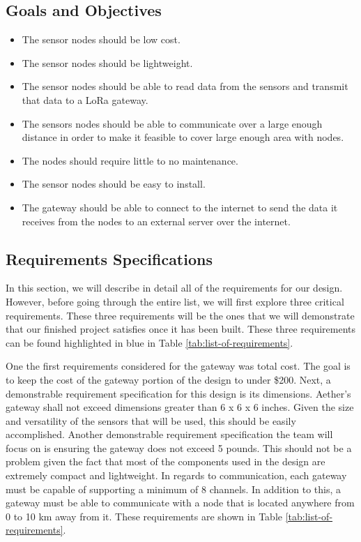 \subsection{Goals and Objectives}
\begin{itemize}
    \item The sensor nodes should be low cost.
    \item The sensor nodes should be lightweight.
    \item The sensor nodes should be able to read data from the sensors and transmit that data to a LoRa gateway.
    \item The sensors nodes should be able to communicate over a large enough distance in order to make it feasible to cover large enough area with nodes.
    \item The nodes should require little to no maintenance.
    \item The sensor nodes should be easy to install.
    \item The gateway should be able to connect to the internet to send the data it receives from the nodes to an external server over the internet.
\end{itemize}


\subsection{Requirements Specifications}
In this section, we will describe in detail all of the requirements for our design. However, before going through the entire list, we will first explore three critical requirements. These three requirements will be the ones that we will demonstrate that our finished project satisfies once it has been built. These three requirements can be found highlighted in blue in Table \ref{tab:list-of-requirements}.

One the first requirements considered for the gateway was total cost. The goal is to keep the cost of the gateway portion of the design to under \$200. Next, a demonstrable requirement specification for this design is its dimensions. Aether’s gateway shall not exceed dimensions greater than 6 x 6 x 6 inches. Given the size and versatility of the sensors that will be used, this should be easily accomplished. Another demonstrable requirement specification the team will focus on is ensuring the gateway does not exceed 5 pounds. This should not be a problem given the fact that most of the components used in the design are extremely compact and lightweight. In regards to communication, each gateway must be capable of supporting a minimum of 8 channels. In addition to this, a gateway must be able to communicate with a node that is located anywhere from 0 to 10 km away from it. These requirements are shown in Table \ref{tab:list-of-requirements}.

